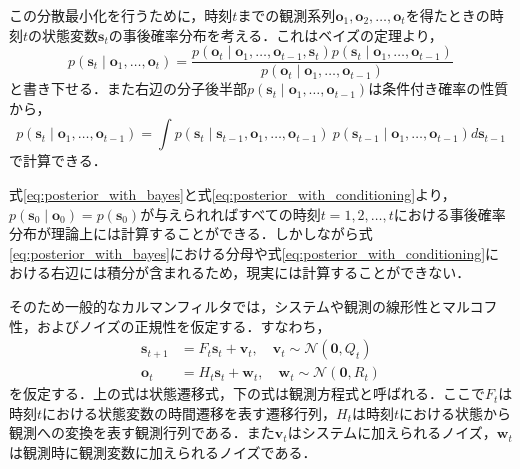         この分散最小化を行うために，時刻$t$までの観測系列$\bm{o}_1, \bm{o}_2, \dots, \bm{o}_t$を得たときの時刻$t$の状態変数$\bm{s}_t$の事後確率分布を考える．これはベイズの定理より，
        \begin{equation}
            \label{eq:posterior_with_bayes}
            p(\bm{s}_t \mid \bm{o}_1,\dots, \bm{o}_t ) = \frac{p(\bm{o}_t \mid \bm{o}_1,\dots, \bm{o}_{t-1}, \bm{s}_t) p(\bm{s}_t \mid \bm{o}_1,\dots, \bm{o}_{t-1})}{p(\bm{o}_t \mid \bm{o}_1,\dots, \bm{o}_{t-1})}
        \end{equation}
        と書き下せる．また右辺の分子後半部$p(\bm{s}_t \mid \bm{o}_1,\dots, \bm{o}_{t-1})$は条件付き確率の性質から，
        \begin{equation}
            \label{eq:posterior_with_conditioning}
            p(\bm{s}_t \mid \bm{o}_1,\dots, \bm{o}_{t-1}) = \int p(\bm{s}_t \mid \bm{s}_{t-1}, \bm{o}_1, \dots, \bm{o}_{t-1}) ~ p(\bm{s}_{t-1} \mid \bm{o}_1, \dots, \bm{o}_{t-1}) d\bm{s}_{t-1}
        \end{equation}
        で計算できる．

        式\ref{eq:posterior_with_bayes}と式\ref{eq:posterior_with_conditioning}より，$p(\bm{s}_0 \mid \bm{o}_0) = p(\bm{s}_0)$が与えられればすべての時刻$t = 1, 2, \dots, t$における事後確率分布が理論上には計算することができる．しかしながら式\ref{eq:posterior_with_bayes}における分母や式\ref{eq:posterior_with_conditioning}における右辺には積分が含まれるため，現実には計算することができない．

        そのため一般的なカルマンフィルタでは，システムや観測の線形性とマルコフ性，およびノイズの正規性を仮定する．すなわち，
        \begin{equation}
            \label{eq:kalman_GL}
            \begin{aligned}
                \bm{s}_{t+1} &= F_t \bm{s}_t + \bm{v}_t, \quad \bm{v}_t \sim \mathcal{N}(\bm{0}, Q_t)
                \\ \bm{o}_t &= H_t \bm{s}_t + \bm{w}_t, \quad \bm{w}_t \sim \mathcal{N}(\bm{0}, R_t)
            \end{aligned}        
        \end{equation}
        を仮定する．上の式は状態遷移式，下の式は観測方程式と呼ばれる．ここで$F_t$は時刻$t$における状態変数の時間遷移を表す遷移行列，$H_t$は時刻$t$における状態から観測への変換を表す観測行列である．また$\bm{v}_t$はシステムに加えられるノイズ，$\bm{w}_t$は観測時に観測変数に加えられるノイズである．

